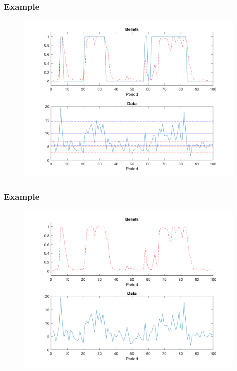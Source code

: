 \documentclass{beamer}
\begin{document}
\begin{frame}
\frametitle[alignment=center]{Example}
\begin{figure}
\centering
\includegraphics[scale=0.5]{Markov4.png}
\end{figure}
\end{frame}

\begin{frame}
\frametitle[alignment=center]{Example}
\begin{figure}
\centering
\includegraphics[scale=0.5]{Markov5.png}
\end{figure}
\end{frame}
\end{document}
